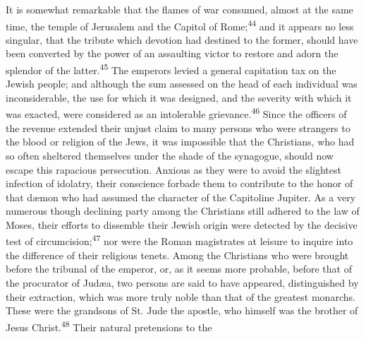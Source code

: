 
It is somewhat remarkable that the flames of war consumed, almost
at the same time, the temple of Jerusalem and the Capitol of
Rome;\textsuperscript{44} and it appears no less singular, that the tribute which
devotion had destined to the former, should have been converted
by the power of an assaulting victor to restore and adorn the
splendor of the latter.\textsuperscript{45} The emperors levied a general
capitation tax on the Jewish people; and although the sum
assessed on the head of each individual was inconsiderable, the
use for which it was designed, and the severity with which it was
exacted, were considered as an intolerable grievance.\textsuperscript{46} Since
the officers of the revenue extended their unjust claim to many
persons who were strangers to the blood or religion of the Jews,
it was impossible that the Christians, who had so often sheltered
themselves under the shade of the synagogue, should now escape
this rapacious persecution. Anxious as they were to avoid the
slightest infection of idolatry, their conscience forbade them to
contribute to the honor of that dæmon who had assumed the
character of the Capitoline Jupiter. As a very numerous though
declining party among the Christians still adhered to the law of
Moses, their efforts to dissemble their Jewish origin were
detected by the decisive test of circumcision;\textsuperscript{47} nor were the
Roman magistrates at leisure to inquire into the difference of
their religious tenets. Among the Christians who were brought
before the tribunal of the emperor, or, as it seems more
probable, before that of the procurator of Judæa, two persons are
said to have appeared, distinguished by their extraction, which
was more truly noble than that of the greatest monarchs. These
were the grandsons of St. Jude the apostle, who himself was the
brother of Jesus Christ.\textsuperscript{48} Their natural pretensions to the
